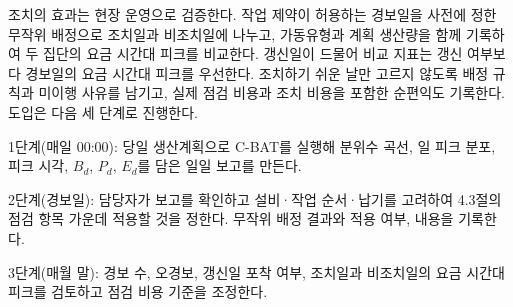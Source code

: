 조치의 효과는 현장 운영으로 검증한다. 작업 제약이 허용하는 경보일을 사전에 정한 무작위 배정으로 조치일과 비조치일에 나누고, 가동유형과 계획 생산량을 함께 기록하여 두 집단의 요금 시간대 피크를 비교한다. 갱신일이 드물어 비교 지표는 갱신 여부보다 경보일의 요금 시간대 피크를 우선한다. 조치하기 쉬운 날만 고르지 않도록 배정 규칙과 미이행 사유를 남기고, 실제 점검 비용과 조치 비용을 포함한 순편익도 기록한다. 도입은 다음 세 단계로 진행한다.
\begin{hwplist}
\item 1단계(매일 00:00): 당일 생산계획으로 C-BAT를 실행해 분위수 곡선, 일 피크 분포, 피크 시각, $B_d$, $P_d$, $E_d$를 담은 일일 보고를 만든다.
\item 2단계(경보일): 담당자가 보고를 확인하고 설비·작업 순서·납기를 고려하여 4.3절의 점검 항목 가운데 적용할 것을 정한다. 무작위 배정 결과와 적용 여부, 내용을 기록한다.
\item 3단계(매월 말): 경보 수, 오경보, 갱신일 포착 여부, 조치일과 비조치일의 요금 시간대 피크를 검토하고 점검 비용 기준을 조정한다.
\end{hwplist}
